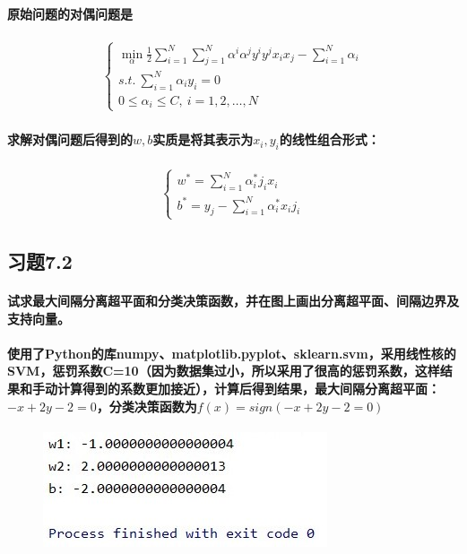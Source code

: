 \documentclass[UTF8]{ctexart}
\begin{document}
\paragraph{原始问题的对偶问题是}
\begin{align*}
    \begin{cases}
        \min\limits_{\alpha}\frac{1}{2}\sum\limits_{i=1}^{N}\sum\limits_{j=1}^{N}\alpha^i\alpha^j y^i y^j x_i x_j-\sum\limits_{i=1}^{N}\alpha_i\\
        s.t. \ \sum\limits_{i=1}^{N}\alpha_i y_i=0 \\
        0\le\alpha_i\le C,\ i=1,2,\dots,N
    \end{cases}
\end{align*}
\paragraph{求解对偶问题后得到的$w,b$实质是将其表示为$x_i,y_i$的线性组合形式：}
\begin{align*}
    \begin{cases}
        w^*=\sum\limits_{i=1}^{N}\alpha_i^*j_ix_i \\
        b^*=y_j-\sum\limits_{i=1}^{N}\alpha_i^*x_ij_i
    \end{cases}
\end{align*}

\subsection{习题7.2}
\paragraph{试求最大间隔分离超平面和分类决策函数，并在图上画出分离超平面、间隔边界及支持向量。}
\paragraph{使用了Python的库numpy、matplotlib.pyplot、sklearn.svm，采用线性核的SVM，惩罚系数C=10（因为数据集过小，所以采用了很高的惩罚系数，这样结果和手动计算得到的系数更加接近），计算后得到结果，最大间隔分离超平面：$-x+2y-2=0$，分类决策函数为$f(x)=sign(-x+2y-2=0)$}
\begin{figure}[htp]
    \includegraphics{Screenshot.jpg}
\end{figure}
\end{document}
